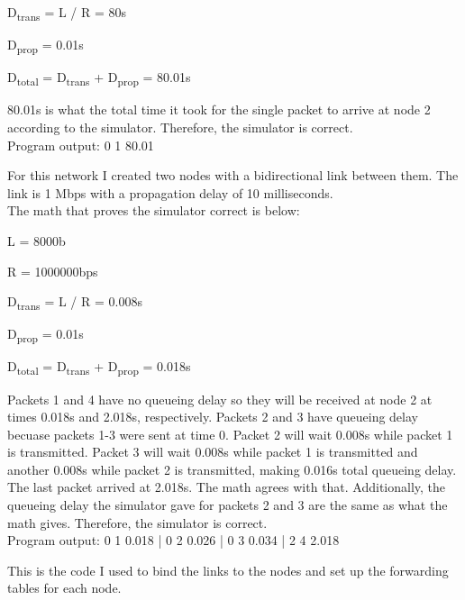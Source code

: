\documentclass[11pt]{article}
\begin{document}
D\textsubscript{trans} = L / R = 80s

D\textsubscript{prop} = 0.01s

D\textsubscript{total} = D\textsubscript{trans} + D\textsubscript{prop} = 80.01s

\noindent
80.01s is what the total time it took for the single packet to arrive at node 2 according to the simulator. Therefore, the simulator is correct.\\Program output: 0 1 80.01



\vspace{1.0cm}

For this network I created two nodes with a bidirectional link between them. The link is 1 Mbps with a propagation delay of 10 milliseconds.\\
The math that proves the simulator correct is below:

L = 8000b

R = 1000000bps

D\textsubscript{trans} = L / R = 0.008s

D\textsubscript{prop} = 0.01s

D\textsubscript{total} = D\textsubscript{trans} + D\textsubscript{prop} = 0.018s

\noindent
Packets 1 and 4 have no queueing delay so they will be received at node 2 at times 0.018s and 2.018s, respectively. Packets 2 and 3 have queueing delay becuase packets 1-3 were sent at time 0. Packet 2 will wait 0.008s while packet 1 is transmitted. Packet 3 will wait 0.008s while packet 1 is transmitted and another 0.008s while packet 2 is transmitted, making 0.016s total queueing delay. The last packet arrived at 2.018s. The math agrees with that. Additionally, the queueing delay the simulator gave for packets 2 and 3 are the same as what the math gives. Therefore, the simulator is correct.\\Program output: 0 1 0.018 | 0 2 0.026 | 0 3 0.034 | 2 4 2.018



\vspace{1.0cm}

This is the code I used to bind the links to the nodes and set up the forwarding tables for each node.
\end{document}
